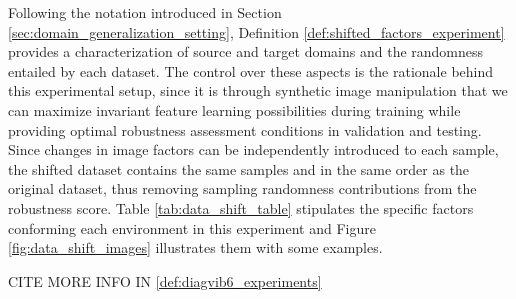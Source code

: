 Following the notation introduced in Section \ref{sec:domain_generalization_setting}, Definition 
\ref{def:shifted_factors_experiment} provides a characterization of source and target domains and
the randomness entailed by each dataset. The control over these aspects is the rationale behind
this experimental setup, since it is through synthetic image manipulation that we can maximize
invariant feature learning possibilities during training while providing optimal robustness
assessment conditions in validation and testing. Since changes in image factors can be independently 
introduced to each sample, the shifted dataset contains the same samples and in the same order
as the original dataset, thus removing sampling randomness contributions from the robustness score. 
Table \ref{tab:data_shift_table} stipulates the specific factors conforming each environment in this
experiment and Figure \ref{fig:data_shift_images} illustrates them with some examples.

CITE MORE INFO IN \ref{def:diagvib6_experiments} \\

